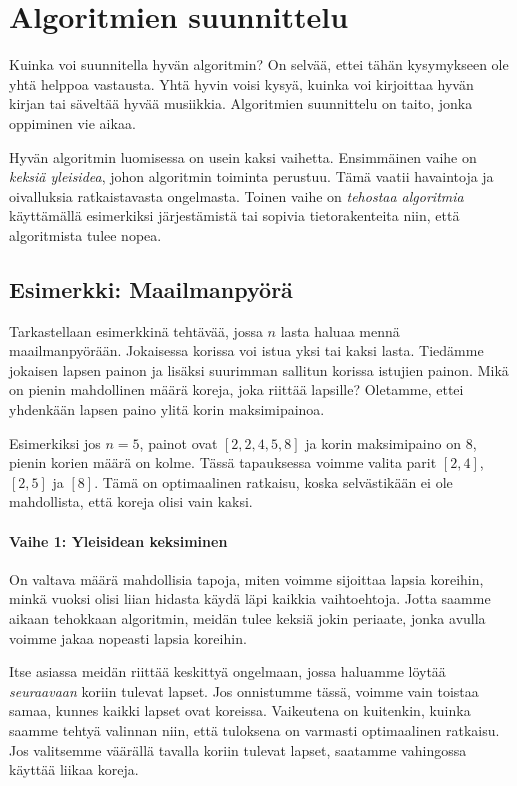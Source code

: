 \chapter{Algoritmien suunnittelu}

Kuinka voi suunnitella hyvän algoritmin?
On selvää, ettei tähän kysymykseen ole yhtä helppoa vastausta.
Yhtä hyvin voisi kysyä, kuinka voi kirjoittaa hyvän kirjan
tai säveltää hyvää musiikkia.
Algoritmien suunnittelu on taito, jonka oppiminen vie aikaa.

Hyvän algoritmin luomisessa on usein kaksi vaihetta.
Ensimmäinen vaihe on \emph{keksiä yleisidea},
johon algoritmin toiminta perustuu.
Tämä vaatii havaintoja ja oivalluksia ratkaistavasta ongelmasta.
Toinen vaihe on \emph{tehostaa algoritmia}
käyttämällä esimerkiksi järjestämistä tai sopivia
tietorakenteita niin, että algoritmista tulee nopea.

\section{Esimerkki: Maailmanpyörä}

Tarkastellaan esimerkkinä tehtävää,
jossa $n$ lasta haluaa mennä maailmanpyörään.
Jokaisessa korissa voi istua yksi tai kaksi lasta.
Tiedämme jokaisen lapsen painon ja lisäksi 
suurimman sallitun korissa istujien painon.
Mikä on pienin mahdollinen määrä koreja,
joka riittää lapsille?
Oletamme, ettei yhdenkään lapsen paino ylitä
korin maksimipainoa.

Esimerkiksi jos $n=5$, painot ovat $[2,2,4,5,8]$
ja korin maksimipaino on $8$,
pienin korien määrä on kolme.
Tässä tapauksessa voimme valita parit
$[2,4]$, $[2,5]$ ja $[8]$.
Tämä on optimaalinen ratkaisu, koska selvästikään
ei ole mahdollista, että koreja olisi vain kaksi.

\subsubsection{Vaihe 1: Yleisidean keksiminen}

On valtava määrä mahdollisia tapoja,
miten voimme sijoittaa lapsia koreihin,
minkä vuoksi olisi liian hidasta käydä läpi
kaikkia vaihtoehtoja.
Jotta saamme aikaan tehokkaan algoritmin,
meidän tulee keksiä jokin periaate,
jonka avulla voimme jakaa nopeasti lapsia koreihin.

Itse asiassa meidän riittää keskittyä ongelmaan,
jossa haluamme löytää \emph{seuraavaan} koriin
tulevat lapset.
Jos onnistumme tässä, voimme vain toistaa samaa,
kunnes kaikki lapset ovat koreissa.
Vaikeutena on kuitenkin, kuinka saamme tehtyä valinnan niin,
että tuloksena on varmasti optimaalinen ratkaisu.
Jos valitsemme väärällä tavalla koriin tulevat lapset,
saatamme vahingossa käyttää liikaa koreja.

